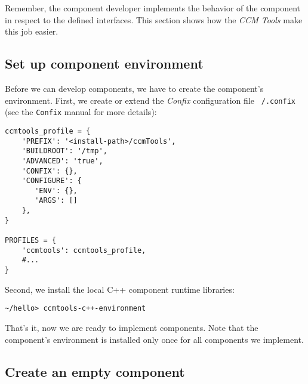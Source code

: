 Remember, the component developer implements the behavior of the component in
respect to the defined interfaces. This section shows how the {\it CCM Tools}
make this job easier.

\subsection{Set up component environment}

Before we can develop components, we have to create the component's environment.
First, we create or extend the {\it Confix} configuration file {\tt ~/.confix}
(see the {\tt Confix} manual for more details):
\begin{verbatim}
ccmtools_profile = {
    'PREFIX': '<install-path>/ccmTools',
    'BUILDROOT': '/tmp',
    'ADVANCED': 'true',
    'CONFIX': {},
    'CONFIGURE': {
       'ENV': {},
       'ARGS': []
    },
}
    
PROFILES = {
    'ccmtools': ccmtools_profile,
    #...
}
\end{verbatim}

\noindent
Second, we install the local C++ component runtime libraries:
\begin{verbatim}
~/hello> ccmtools-c++-environment
\end{verbatim}

\noindent
That's it, now we are ready to implement components. Note that the component's
environment is installed only once for all components we implement.


\subsection{Create an empty component}

